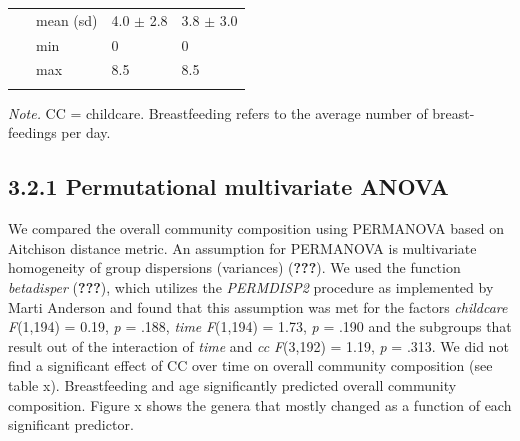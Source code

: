 \documentclass[,man]{apa6}
\begin{document}
\begin{table}[tbp]
\begin{center}
\begin{threeparttable}
\begin{tabular}{lll}
\ \ \ mean (sd) & 4.0 $\pm$ 2.8 & 3.8 $\pm$ 3.0\\
\ \ \ min & 0 & 0\\
\ \ \ max & 8.5 & 8.5\\
\bottomrule
\addlinespace
\end{tabular}
\begin{tablenotes}[para]
\normalsize{\textit{Note.} CC = childcare. Breastfeeding refers to the average number of breast-feedings per day.}
\end{tablenotes}
\end{threeparttable}
\end{center}
\end{table}

\subsection{3.2.1 Permutational multivariate
ANOVA}\label{permutational-multivariate-anova}

We compared the overall community composition using PERMANOVA based on
Aitchison distance metric. An assumption for PERMANOVA is multivariate
homogeneity of group dispersions (variances) ({\textbf{???}}). We used
the function \emph{betadisper} ({\textbf{???}}), which utilizes the
\emph{PERMDISP2} procedure as implemented by Marti Anderson and found
that this assumption was met for the factors \emph{childcare}
\emph{F}(1,194) = 0.19, \emph{p} = .188, \emph{time} \emph{F}(1,194) =
1.73, \emph{p} = .190 and the subgroups that result out of the
interaction of \emph{time} and \emph{cc} \emph{F}(3,192) = 1.19,
\emph{p} = .313. We did not find a significant effect of CC over time on
overall community composition (see table x). Breastfeeding and age
significantly predicted overall community composition. Figure x shows
the genera that mostly changed as a function of each significant
predictor.
\end{document}
